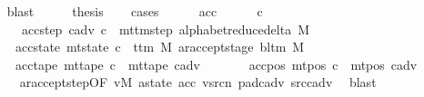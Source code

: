 \begin{isabellebody}
\ \ \ \ \isamarkupfalse%
\ blast\isanewline
\ \ \isamarkupfalse%
\ \isamarkupfalse%
\ thesis\isanewline
\ \ \isamarkupfalse%
\ cases\isanewline
\ \ \ \ \isamarkupfalse%
\ acc\isanewline
\ \ \ \ \isamarkupfalse%
\ c{\isacharprime}{\kern0pt}{\isacharprime}{\kern0pt}\ \isanewline
\ \ \ \ \ \ \ \ acc{\isacharunderscore}{\kern0pt}step{\isacharcolon}{\kern0pt}\ {\isachardoublequoteopen}{\isacharparenleft}{\kern0pt}c{\isacharunderscore}{\kern0pt}adv{\isacharcomma}{\kern0pt}\ c{\isacharprime}{\kern0pt}{\isacharprime}{\kern0pt}{\isacharparenright}{\kern0pt}\ {\isasymin}\ mttm{\isacharunderscore}{\kern0pt}step\ {\isacharparenleft}{\kern0pt}alphabet{\isacharunderscore}{\kern0pt}reduce{\isacharunderscore}{\kern0pt}delta\ M{\isacharparenright}{\kern0pt}{\isachardoublequoteclose}\isanewline
\ \ \ \ \ \ \ acc{\isacharunderscore}{\kern0pt}state{\isacharcolon}{\kern0pt}\ {\isachardoublequoteopen}mt{\isacharunderscore}{\kern0pt}state\ c{\isacharprime}{\kern0pt}{\isacharprime}{\kern0pt}\ {\isacharequal}{\kern0pt}\ {\isacharparenleft}{\kern0pt}t{\isacharunderscore}{\kern0pt}tm\ M{\isacharcomma}{\kern0pt}\ ar{\isacharunderscore}{\kern0pt}accept{\isacharunderscore}{\kern0pt}stage\ {\isacharparenleft}{\kern0pt}bl{\isacharunderscore}{\kern0pt}tm\ M{\isacharparenright}{\kern0pt}{\isacharparenright}{\kern0pt}{\isachardoublequoteclose}\isanewline
\ \ \ \ \ \ \ acc{\isacharunderscore}{\kern0pt}tape{\isacharcolon}{\kern0pt}\ {\isachardoublequoteopen}mt{\isacharunderscore}{\kern0pt}tape\ c{\isacharprime}{\kern0pt}{\isacharprime}{\kern0pt}\ {\isacharequal}{\kern0pt}\ mt{\isacharunderscore}{\kern0pt}tape\ c{\isacharunderscore}{\kern0pt}adv{\isachardoublequoteclose}\isanewline
\ \ \ \ \ \ \ acc{\isacharunderscore}{\kern0pt}pos{\isacharcolon}{\kern0pt}\ {\isachardoublequoteopen}mt{\isacharunderscore}{\kern0pt}pos\ c{\isacharprime}{\kern0pt}{\isacharprime}{\kern0pt}\ {\isacharequal}{\kern0pt}\ mt{\isacharunderscore}{\kern0pt}pos\ c{\isacharunderscore}{\kern0pt}adv{\isachardoublequoteclose}\isanewline
\ \ \ \ \ \ \isamarkupfalse%
\ ar{\isacharunderscore}{\kern0pt}accept{\isacharunderscore}{\kern0pt}step{\isacharbrackleft}{\kern0pt}OF\ vM\ a{\isacharunderscore}{\kern0pt}state\ acc\ vsrc{\isacharunderscore}{\kern0pt}n\ pad{\isacharunderscore}{\kern0pt}cadv\ src{\isacharunderscore}{\kern0pt}cadv{\isacharbrackright}{\kern0pt}\ \isamarkupfalse%
\ blast\isanewline

\end{isabellebody}
